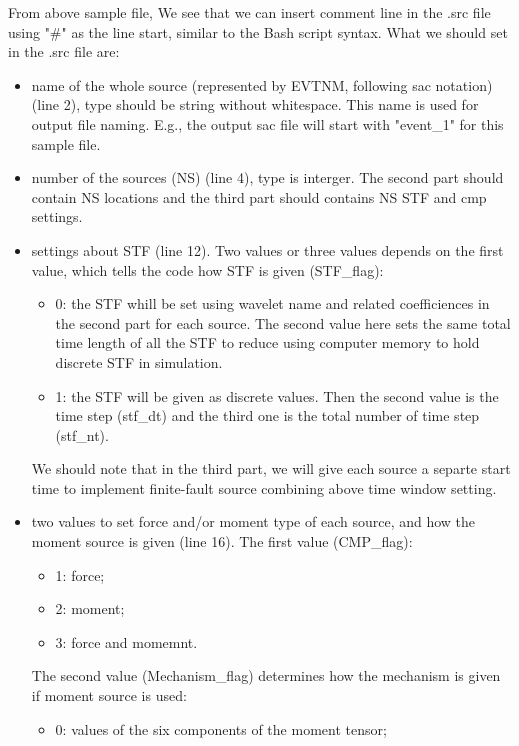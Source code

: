 From above sample file, We see that we can insert comment line in the .src file using "\#" as the line start, similar to the Bash script syntax.
What we should set in the .src file are:
\begin{itemize}
    \item name of the whole source (represented by EVTNM, following sac notation) (line 2), type should be string without whitespace.
        This name is used for output file naming.
        E.g., the output sac file will start with "event\_1" for this sample file.
    \item number of the sources (NS) (line 4), type is interger.
         The second part should contain NS locations and the third part should contains NS STF and cmp settings.
    \item settings about STF (line 12). Two values or three values depends on the first value,
        which tells the code how STF is given (STF\_flag): 
        \begin{itemize}
        \item 0: the STF whill be set using wavelet name and related coefficiences in the second part for each source.
              The second value here sets the same total time length of all the STF 
              to reduce using computer memory to hold discrete STF in simulation.
        \item 1: the STF will be given as discrete values.
              Then the second value is the time step (stf\_dt) and the third one is the total number of time step (stf\_nt).
        \end{itemize}
        We should note that in the third part, we will give each source a separte start time to implement finite-fault source combining
        above time window setting.
    \item two values to set force and/or moment type of each source, and how the moment source is given (line 16).
        The first value (CMP\_flag):
        \begin{itemize}
            \item 1: force;
            \item 2: moment;
            \item 3: force and momemnt.
        \end{itemize}
        The second value (Mechanism\_flag) determines how the mechanism is given if moment source is used:
        \begin{itemize}
            \item 0: values of the six components of the moment tensor;

\end{itemize}
\end{itemize}

